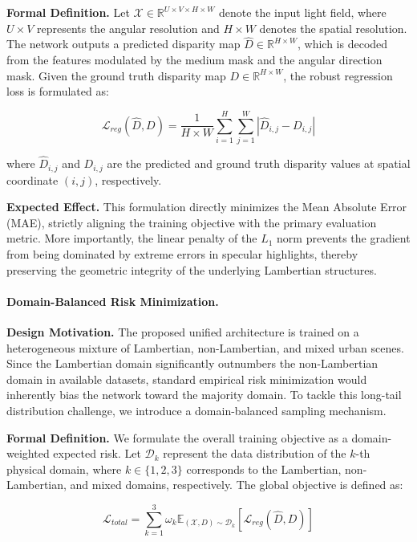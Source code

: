 \documentclass[lettersize,journal]{IEEEtran}
\begin{document}
\textbf{Formal Definition.} Let $\mathcal{X} \in \mathbb{R}^{U \times V \times H \times W}$ denote the input light field, where $U \times V$ represents the angular resolution and $H \times W$ denotes the spatial resolution. The network outputs a predicted disparity map $\hat{D} \in \mathbb{R}^{H \times W}$, which is decoded from the features modulated by the medium mask and the angular direction mask. Given the ground truth disparity map $D \in \mathbb{R}^{H \times W}$, the robust regression loss is formulated as:

\begin{equation}
\label{eq:eq12}
\mathcal{L}_{reg}(\hat{D}, D) = \frac{1}{H \times W} \sum_{i=1}^{H} \sum_{j=1}^{W} \left| \hat{D}_{i,j} - D_{i,j} \right|
\end{equation}

where $\hat{D}_{i,j}$ and $D_{i,j}$ are the predicted and ground truth disparity values at spatial coordinate $(i, j)$, respectively. 

\textbf{Expected Effect.} This formulation directly minimizes the Mean Absolute Error (MAE), strictly aligning the training objective with the primary evaluation metric. More importantly, the linear penalty of the $L_1$ norm prevents the gradient from being dominated by extreme errors in specular highlights, thereby preserving the geometric integrity of the underlying Lambertian structures.

\paragraph{Domain-Balanced Risk Minimization.}

\textbf{Design Motivation.} The proposed unified architecture is trained on a heterogeneous mixture of Lambertian, non-Lambertian, and mixed urban scenes. Since the Lambertian domain significantly outnumbers the non-Lambertian domain in available datasets, standard empirical risk minimization would inherently bias the network toward the majority domain. To tackle this long-tail distribution challenge, we introduce a domain-balanced sampling mechanism.

\textbf{Formal Definition.} We formulate the overall training objective as a domain-weighted expected risk. Let $\mathcal{D}_k$ represent the data distribution of the $k$-th physical domain, where $k \in \{1, 2, 3\}$ corresponds to the Lambertian, non-Lambertian, and mixed domains, respectively. The global objective is defined as:

\begin{equation}
\label{eq:eq13}
\mathcal{L}_{total} = \sum_{k=1}^{3} \omega_k \mathbb{E}_{(\mathcal{X}, D) \sim \mathcal{D}_k} \left[ \mathcal{L}_{reg}(\hat{D}, D) \right]
\end{equation}
\end{document}
